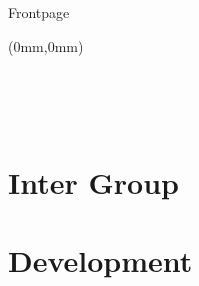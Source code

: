 
%

	Frontpage
	\listoftodos
	\begin{titlepage}
	\begin{textblock*}{297mm}(0mm,0mm)
		 \hspace{-6.5mm}

		

	\end{textblock*}
	\thispagestyle{empty}

\ \pagebreak{} 
	\end{titlepage}
\ \thispagestyle{empty} \ \pagebreak{}



\tableofcontents
\cleardoublepage
	
\newpage
\thispagestyle{empty}
\begin{titlepage}
\end{titlepage}
	
	
	\part{Inter Group}
	
	
	
	
	
	
	
	
	
	
 
\part{Development}

	
	
	

	
	
	
	
	
	
	
